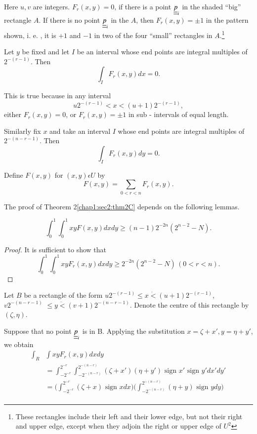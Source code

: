 Here $u, v$ are integers. $F_{r} (x, y) = 0$, if there is a point $\underline{\underline{p}}_{i}$ in the shaded ``big'' rectangle $A$. If there is no point $\underline{\underline{p}}_{i}$ in the $A$, then $F_{r} (x, y) = \pm 1$ in the pattern shown, i. e. , it is $+1$ and $-1$ in two of the four ``small'' rectangles in $A$.\footnote{These rectangles include their left and their lower edge, but not their right and upper edge, except when they adjoin the right or upper edge of $U^{2}$}

Let $y$ be fixed and let $I$ be an interval whose end points are integral multiples of $2^{-(r-1)}$. Then
$$
\int_{I} F_{r} (x, y) dx = 0.
$$\pageoriginale 

This is true because in any interval
$$
u2^{-(r-1)} < x < (u+1)2^{-(r-1)},
$$
either $F_{r}(x, y) = 0$, or $F_{r}(x, y) = \pm 1$ in sub - intervals of equal length.

Similarly fix $x$ and take an interval $I$ whose end points are integral multiples of $2^{-(n-r-1)}$. Then
$$
\int_{I} F_{r} (x, y)dy = 0.
$$

Define $F(x, y)$ for $(x, y) \epsilon U$ by
$$
F(x, y) = \sum_{0 < r < n} F_{r} (x, y).
$$

The proof of Theorem 2\ref{chap1:sec2:thm2C} depends on the following lemmas.

\begin{lemma}\label{chap1:sec3:lem3A}
 $$
\int_{0}^{1} \int_{0}^{1} xy F(x, y) dx dy \geq (n-1) 2^{-2n} (2^{n-2}-N).
$$
\end{lemma} 

\begin{proof}
It is sufficient to show that
$$
\int_{0}^{1} \int_{0}^{1} xy F_{r} (x, y) dx dy \geq 2^{-2n} (2^{n-2}-N)\, (0 < r < n).
$$
\end{proof}

\noindent Let $B$ be a rectangle of the form $u2^{-(r-1)} \leq x \dot{<} (u+1)2^{-(r-1)}$, $v2^{-(n-r-1)}$ $\leq y \dot{<} (v+1) 2^{-(n-r-1)}$. Denote the centre of this rectangle by $(\zeta, \eta)$.

Suppose that no point $\underline{\underline{p}}_{i}$ is in B. Applying the substitution $x = \zeta + x', y = \eta+y'$, we obtain
\begin{align*}
\int_{R} & \int xy F_{r}(x, y)dx  dy\\ 
& = \int_{-2^{-r}}^{2^{-r}} \int_{-2^{-(n-r)}}^{2^{-(n-r)}} (\zeta+x')(\eta+y')\text{ sign }x' \text{ sign }y' dx' dy'\\
& = \Bigg(\int_{-2^{-r}}^{2^{-r}} (\zeta+x)\text{ sign }x dx\Bigg)\Bigg(\int_{-2^{-(n-r)}}^{2^{-(n-r)}} (\eta+y)\text{ sign }y dy\Bigg)\\
\end{align*}

